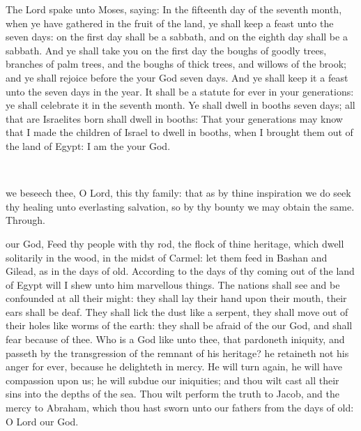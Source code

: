  The Lord spake unto Moses, saying: In the fifteenth day of the seventh month, when ye have gathered in the fruit of the land, ye shall keep a feast unto the  seven days: on the first day shall be a sabbath, and on the eighth day shall be a sabbath. And ye shall take you on the first day the boughs of goodly trees, branches of palm trees, and the boughs of thick trees, and willows of the brook; and ye shall rejoice before the  your God seven days. And ye shall keep it a feast unto the  seven days in the year. It shall be a statute for ever in your generations: ye shall celebrate it in the seventh month. Ye shall dwell in booths seven days; all that are Israelites born shall dwell in booths: That your generations may know that I made the children of Israel to dwell in booths, when I brought them out of the land of Egypt: I am the  your God.

\\


\vspace{-0.2\baselineskip}

\collect

\vspace{-0.1\baselineskip}

 we beseech thee, O Lord, this thy family: that as by thine inspiration we do seek thy healing unto everlasting salvation, so by thy bounty we may obtain the same. Through.

\vspace{-0.2\baselineskip}


\vspace{-0.1\baselineskip}

 our God, Feed thy people with thy rod, the flock of thine heritage, which dwell solitarily in the wood, in the midst of Carmel: let them feed in Bashan and Gilead, as in the days of old. According to the days of thy coming out of the land of Egypt will I shew unto him marvellous things. The nations shall see and be confounded at all their might: they shall lay their hand upon their mouth, their ears shall be deaf. They shall lick the dust like a serpent, they shall move out of their holes like worms of the earth: they shall be afraid of the  our God, and shall fear because of thee. Who is a God like unto thee, that pardoneth iniquity, and passeth by the transgression of the remnant of his heritage? he retaineth not his anger for ever, because he delighteth in mercy. He will turn again, he will have compassion upon us; he will subdue our iniquities; and thou wilt cast all their sins into the depths of the sea. Thou wilt perform the truth to Jacob, and the mercy to Abraham, which thou hast sworn unto our fathers from the days of old: O Lord our God.

